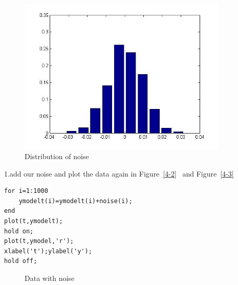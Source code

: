 \documentclass[a4paper]{article}
\begin{document}
\begin{figure}[htb]
\centering
\includegraphics[width=10cm]{4-0.jpg}
\caption{Distribution of noise}
\label{4-0}
\end{figure}

1.add our noise and plot the data again in Figure~\ref{4-2} \ and Figure~\ref{4-3}
\begin{verbatim}
for i=1:1000
    ymodelt(i)=ymodelt(i)+noise(i);
end
plot(t,ymodelt);
hold on;
plot(t,ymodel,'r');
xlabel('t');ylabel('y');
hold off;
\end{verbatim}

\begin{figure}[H]
\centering
{}
\caption{Data with noise}
\end{figure}
\end{document}
